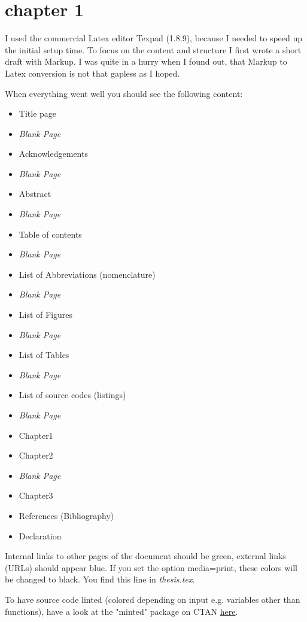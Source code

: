 \chapter{chapter 1}
\label{ch:chapter1}

I used the commercial Latex editor Texpad (1.8.9), because I needed to speed up the initial setup time.  To focus on the content and structure I first wrote a short draft with Markup. I was quite in a hurry when I found out, that Markup to Latex conversion is not that gapless as I hoped.

When everything went well you should see the following content:

\begin{itemize}
	\item Title page
	\item \textit{Blank Page}
	\item Acknowledgements
	\item \textit{Blank Page}
	\item Abstract
	\item \textit{Blank Page}
	\item Table of contents
	\item \textit{Blank Page}
	\item List of Abbreviations (nomenclature)
	\item \textit{Blank Page}
	\item List of Figures
	\item \textit{Blank Page}
	\item List of Tables
	\item \textit{Blank Page}
	\item List of source codes (listings)
	\item \textit{Blank Page}
	\item Chapter1
	\item Chapter2
	\item \textit{Blank Page}
	\item Chapter3
	\item References (Bibliography)
	\item Declaration
\end{itemize}

Internal links to other pages of the document should be green, external links (URLs) should appear blue. If you set the option media=print, these colors will be changed to black. You find this line in \textit{thesis.tex}.

To have source code linted (colored depending on input e.g. variables other than functions), have a look at the "minted" package on CTAN \href{http://tug.ctan.org/tex-archive/macros/latex/contrib/minted/minted.pdf}{here}.

